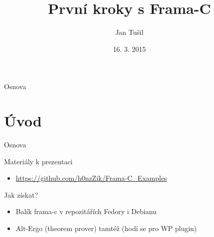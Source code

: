 \documentclass[11pt]{beamer}
\author{Jan Tušil}
\title{První kroky s Frama-C}
\date{16. 3. 2015}
\begin{document}
\begin{frame}
\titlepage
\end{frame}

\begin{frame}{Osnova}
\tableofcontents[]
\end{frame}

\section{Úvod}

\begin{frame}{Osnova}
\tableofcontents[currentsection]
\end{frame}

\begin{frame}{Materiály k prezentaci}
\begin{itemize}
	\item \url{https://github.com/h0nzZik/Frama-C_Examples}
\end{itemize}
\end{frame}

\begin{frame}{Jak získat?}
	\begin{itemize}
		\item Balík frama-c v repozitářích Fedory i Debianu
		\item Alt-Ergo (theorem prover) tamtéž (hodí se pro WP plugin)
	\end{itemize}
\end{frame}
\end{document}
